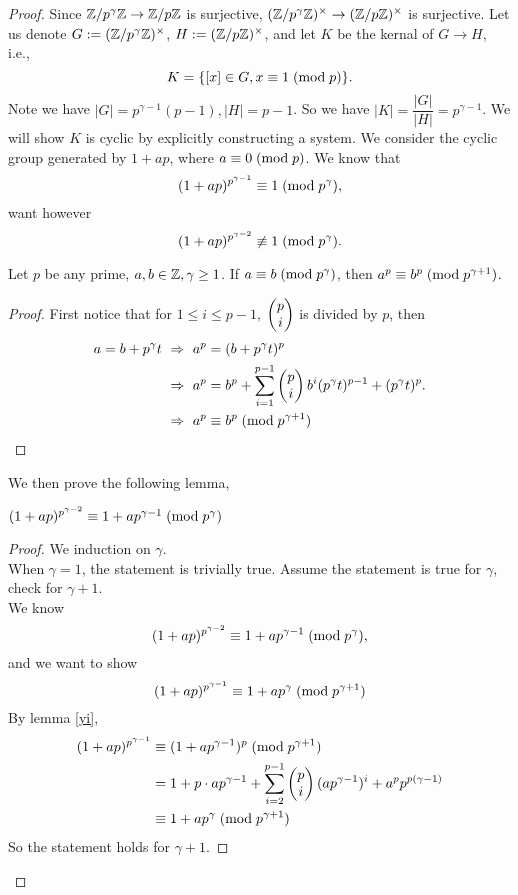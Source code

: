 \begin{proof}
	Since $\mathbb{Z}/p^{\gamma}\mathbb{Z}\rightarrow\mathbb{Z}/p\mathbb{Z}$ is surjective, $(\mathbb{Z}/p^{\gamma}\mathbb{Z})^{\times}\rightarrow(\mathbb{Z}/p\mathbb{Z})^{\times}$ is surjective. Let us denote $G:=(\mathbb{Z}/p^{\gamma}\mathbb{Z})^{\times}$, $H:=(\mathbb{Z}/p\mathbb{Z})^{\times}$, and let $K$ be the kernal of $G\rightarrow H$, i.e.,
	 $$K=\{[x]\in G, x\equiv 1\;(\mbox{mod}{\;p})\}.$$
	Note we have $|G|=p^{\gamma -1 }(p-1), |H| = p-1$. So we have $|K| = \dfrac{|G|}{|H|} = p^{\gamma -1}$. We will show $K$ is cyclic by explicitly constructing a system. We consider the cyclic group generated by $1+ap$, where $a\equiv 0\;(\mbox{mod}{\;p})$. We know that 
	$$(1+ap)^{p^{\gamma-1}}\equiv 1\;(\mbox{mod}{\;p^{\gamma}}),$$want however 
	$$(1+ap)^{p^{\gamma-2}}\not\equiv 1\;(\mbox{mod}{\;p^{\gamma}}).$$
	\begin{lemma}\label{yi}
		Let $p$ be any prime, $a,b\in\mathbb{Z},\gamma\ge1$. If $a\equiv b\;(\mbox{mod}{\;p^{\gamma}})$, then $a^p\equiv b^p\;(\mbox{mod}{\;p^{\gamma+1}})$.
	\end{lemma}
	\begin{proof}
		First notice that for $1\le i \le p-1$, $\begin{pmatrix}p\\ i \end{pmatrix}$ is divided by $p$, then
		\begin{align*}
			a=b+p^\gamma t\ &\Rightarrow\ a^p=(b+p^\gamma t)^p\\
			&\Rightarrow\ a^p=b^p+\sum\limits_{i=1}^{p-1}\comb{p}{i}b^i (p^\gamma t)^{p-1} + (p^{\gamma}t)^{p}.\\
			&\Rightarrow\ a^p\con{b^p}{p^{\gamma+1}}
		\end{align*}
	\end{proof}
	We then prove the following lemma,
	\begin{lemma}
		$(1+ap)^{p^{\gamma-2}}\equiv 1+ap^{\gamma-1}\;(\mbox{mod}{\;p^{\gamma}})$
	\end{lemma}
	\begin{proof}
		We induction on $\gamma$.\\When $\gamma=1$, the statement is trivially true. Assume the statement is true for $\gamma$, check for $\gamma+1$.\\
		We know $$(1+ap)^{p^{\gamma-2}}\equiv 1+ap^{\gamma -1}\;(\mbox{mod}{\;p^\gamma}),$$and we want to show $$(1+ap)^{p^{\gamma-1}}\equiv 1+ap^{\gamma}\;(\mbox{mod}{\;p^{\gamma+1}})$$By lemma \ref{yi}, \begin{align*}(1+ap)^{p^{\gamma-1}}&\equiv (1+ap^{\gamma-1})^p\;(\mbox{mod}{\;p^{\gamma+1}})\\
		&= 1+ p\cdot ap^{\gamma-1}+\sum\limits_{i=2}^{p-1}\begin{pmatrix}p\\ i \end{pmatrix}(ap^{\gamma-1})^i+a^pp^{p(\gamma-1)}\\
		&\equiv 1+ap^{\gamma}\;(\mbox{mod}{\;p^{\gamma+1}})
		\end{align*}
		So the statement holds for $\gamma+1$.
	\end{proof}
\end{proof}

